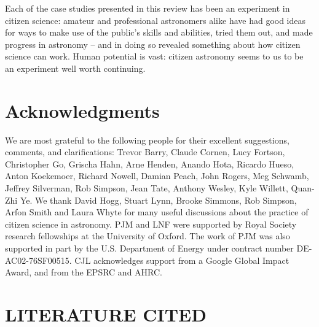 \documentclass{ar2e}
\begin{document}
Each of the case studies presented in this review has been an experiment in
citizen science: amateur and professional astronomers alike have had good
ideas for ways to make use of the public's skills and abilities, tried them
out, and  made progress in astronomy -- and in doing so revealed something
about how citizen science can work. Human potential is vast: citizen astronomy
seems to us to be an experiment well worth continuing. 



\section*{Acknowledgments}

We are most grateful to the following people for their excellent suggestions,
comments, and clarifications: 
Trevor Barry, 
Claude Cornen, 
Lucy Fortson, 
Christopher Go, 
Grischa Hahn, 
Arne Henden,
Anando Hota,
Ricardo Hueso, 
Anton Koekemoer,
Richard Nowell, 
Damian Peach,  
John Rogers,
Meg Schwamb,
Jeffrey Silverman, 
Rob Simpson, 
Jean Tate, 
Anthony Wesley, 
Kyle Willett, 
Quan-Zhi Ye.
%
We thank David Hogg, Stuart Lynn, Brooke Simmons, Rob Simpson, Arfon Smith and 
Laura Whyte for many useful discussions about the practice of citizen science 
in astronomy.
%
PJM and LNF were supported by Royal Society research fellowships at the
University of Oxford. The work of PJM was also supported in part  by the U.S.
Department of Energy under contract number DE-AC02-76SF00515. CJL acknowledges
support from a Google Global Impact Award, and from the EPSRC and AHRC. 



\section{LITERATURE CITED}



% 

\end{document}
